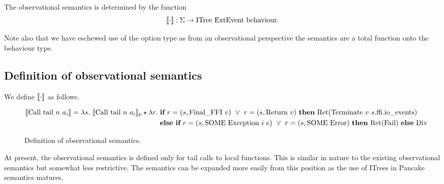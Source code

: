 \documentclass{article}
\begin{document}
The observational semantics is determined by the function
\begin{equation}
  \label{eq:3}
  \sem{\cdot} : \Sigma \to \text{ITree}\ \text{ExtEvent}\ \text{behaviour}.
\end{equation}

Note also that we have eschewed use of the option type as from an observational perspective the semantics are a total function onto the behaviour type.

\subsection{Definition of observational semantics}
\label{sec:defin-observ-semant}

We define $\llbracket \cdot \rrbracket$ as follows.

\begin{figure}[H]
  \begin{adjustwidth}{-4cm}{0pt}
  \begin{align*}
    \sem{\text{Call tail}\ n\ a_{i}} = \lambda s.\ \sem{\text{Call tail}\ n\ a_{i}}_{p} \star \lambda r.\ & \textbf{if}\ r = (s, \text{Final\_FFI}\ v)\ \lor\ r = (s, \text{Return}\ v)\ \textbf{then}\ \text{Ret}(\text{Terminate}\ v\ s.\text{ffi}.\text{io\_events})\ \\ & \textbf{else if}\ r = (s, \text{SOME Exception}\ i\ e)\ \lor\ r = (s, \text{SOME Error})\ \textbf{then}\ \text{Ret}(\text{Fail})\ \textbf{else}\ \text{Div}
  \end{align*}
  \end{adjustwidth}
  \caption{Definition of observational semantics.}
  \label{fig:sem_obs}
\end{figure}

At present, the observational semantics is defined only for tail calls to local functions. This is similar in nature to the existing observational semantics but somewhat less restrictive. The semantics can be expanded more easily from this position as the use of ITrees in Pancake semantics matures.
\end{document}
